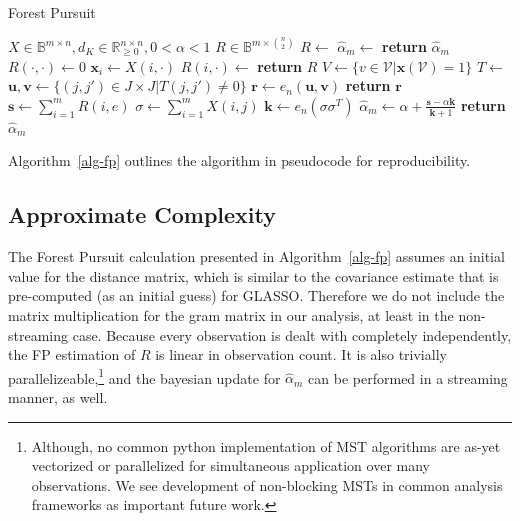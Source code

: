 \documentclass[%
	12pt,
		oneside,
		letterpaper
]{book}
\begin{document}
\begin{algorithm}[htb!]
\caption{Forest Pursuit}
\label{alg-fp}
\begin{algorithmic}[1]
\Require $X\in \mathbb{B}^{m\times n}, d_K\in \mathbb{R}_{\geq 0}^{n\times n}, 0<\alpha<1$
\Ensure $R \in \mathbb{B}^{m \times {n\choose 2}}$
  \State $R \gets $
  \State $\hat{\alpha}_m\gets$
  \State \textbf{return} $\hat{\alpha}_m$
\EndProcedure
{}
  \State $R(\cdot,\cdot) \gets 0$
    \State $\mathbf{x}_i \gets X(i,\cdot)$
    \State $R(i,\cdot) \gets $ 
  \EndFor
  \State \textbf{return} $R$
\EndProcedure
{}
  \State $V \gets \{v\in \mathcal{V} | \mathbf{x}(\mathcal{V})=1\}$
  \State $T \gets$
  \State $\mathbf{u,v}\gets \{(j,j')\in J\times J | T(j,j')\neq 0\}$
  \State $\mathbf{r} \gets e_n(\mathbf{u,v})$
  \State \textbf{return} $\mathbf{r}$ 
\EndProcedure
{}
  \State $\mathbf{s} \gets \sum_{i=1}^m R(i,e)$
  \State $\sigma \gets \sum_{i=1}^m X(i,j)$
  \State $\mathbf{k} \gets e_n(\sigma\sigma^T)$
  \State $\hat{\alpha}_m \gets \alpha + \frac{\mathbf{s}-\alpha \mathbf{k}}{\mathbf{k}+1}$
  \State \textbf{return} $\hat{\alpha}_m$
\EndProcedure
\end{algorithmic}
\end{algorithm}

Algorithm~\ref{alg-fp} outlines the algorithm in pseudocode for reproducibility.

\subsection{Approximate Complexity}\label{sec-fp-complexity}

The Forest Pursuit calculation presented in Algorithm~\ref{alg-fp} assumes an initial value for the distance matrix, which is similar to the covariance estimate that is pre-computed (as an initial guess) for GLASSO.
Therefore we do not include the matrix multiplication for the gram matrix in our analysis, at least in the non-streaming case.
Because every observation is dealt with completely independently, the FP estimation of \(R\) is linear in observation count.
It is also trivially parallelizeable,\footnote{Although, no common python implementation of MST algorithms are as-yet vectorized or parallelized for simultaneous application over many observations.
  We see development of non-blocking MSTs in common analysis frameworks as important future work.}
and the bayesian update for \(\hat{\alpha}_m\) can be performed in a streaming manner, as well.
\end{document}
